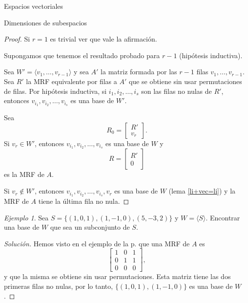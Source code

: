 \documentclass[a4paper,12pt,twoside,spanish,reqno]{amsbook}
\numberwithin{equation}{section}
\theoremstyle{definition}
\theoremstyle{remark}
\newtheorem*{ejemplo*}{Ejemplo}
\begin{document}
\begin{chapter}{Espacios vectoriales}
\begin{section}{Dimensiones de subespacios}
\begin{proof}
        Si $r = 1$ es trivial ver que vale la afirmación. 
        
        Supongamos que tenemos el resultado probado para $r-1$ (hipótesis inductiva).
    	
        Sea $W' = \langle  v_1,\ldots, v_{r-1} \rangle$ y sea $A'$ la matriz formada por las $r-1$ filas $v_1,\ldots, v_{r-1}$. 		
        Sea $R'$ la MRF equivalente por filas a $A'$ que se obtiene sin usar permutaciones de filas. Por hipótesis inductiva, si $i_1,i_2,\ldots,i_s$ son las filas no nulas de $R'$,  entonces $v_{i_1},v_{i_2},\ldots,v_{i_s}$ es una base de $W'$.
        
        Sea
        \begin{equation*}
            R_0 = \begin{bmatrix}
            R' \\ v_r
            \end{bmatrix}.
        \end{equation*}
        Si $v_r \in W'$, entonces  $v_{i_1},v_{i_2},\ldots,v_{i_s}$ es una base de $W$ y 
        \begin{equation*}
        R = \begin{bmatrix}
        R' \\ 0
        \end{bmatrix}
        \end{equation*}
        es la MRF de $A$.
        
        Si $v_r \not\in W'$, entonces  $v_{i_1},v_{i_2},\ldots,v_{i_s}, v_r$ es una base de $W$ (lema \ref{li+vec=li}) y la MRF de $A$ tiene la última fila no nula.  
    \end{proof}


    \begin{ejemplo*}
        Sea $S = \{(1,0,1),(1,-1,0), (5,-3,2)\}$ y $W = \langle S\rangle$. Encontrar una base de $W$ que sea un subconjunto de $S$. 
    \end{ejemplo*}
    \begin{proof}[Solución] Hemos visto en el ejemplo de la p. \pageref{ej-4.5} que una  MRF de $A$  es 
        \begin{equation*}
            \begin{bmatrix} 1&0&1\\0&1&1\\0&0&0 \end{bmatrix},
        \end{equation*}
        y que la misma se obtiene sin usar permutaciones. Esta matriz tiene las dos primeras filas no nulas, por lo tanto, $\{(1,0,1),(1,-1,0)\}$ es una base de $W$.
    \end{proof}


\end{section}
\end{chapter}
\end{document}
